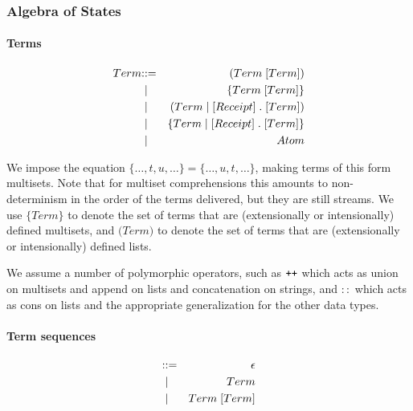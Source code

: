 \subsubsection{Algebra of States}


\paragraph{Terms}
\begin{eqnarray*}
  Term & \mathbin{\mathbf{::=}} & \mathsf{(} Term \; [Term] \mathsf{)} \\
  & \;\mathbin{\mathbf\mid}\; & \mathsf{\{} Term \; [Term] \mathsf{\}} \\
  & \;\mathbin{\mathbf\mid}\; & \mathsf{(} Term{} \;\mathsf{|}\; [Receipt] \; \mathsf{.} \; [Term] \mathsf{)} \\
  & \;\mathbin{\mathbf\mid}\; & \mathsf{\{} Term \;\mathsf{|}\; [Receipt] \; \mathsf{.} \; [Term] \mathsf{\}} \\
& \;\mathbin{\mathbf\mid}\; & Atom
\end{eqnarray*}

We impose the equation $\mathsf{\{} \ldots, t, u, \ldots \mathsf{\}} = \mathsf{\{} \ldots, u, t, \ldots \mathsf{\}}$, making terms of this form multisets. Note that for multiset comprehensions this amounts to non-determinism in the order of the terms delivered, but they are still streams. We use $\mathsf{\{}Term\mathsf{\}}$ to denote the set of terms that are (extensionally or intensionally) defined multisets, and $\mathsf{(}Term\mathsf{)}$ to denote the set of terms that are (extensionally or intensionally) defined lists.

We assume a number of polymorphic operators, such as $\mathbin{\text{\ttfamily\upshape ++}}$ which acts as union on multisets and append on lists and concatenation on strings, and $::$ which acts as cons on lists and the appropriate generalization for the other data types.

\paragraph{Term sequences}
\begin{eqnarray*}
  [Term] & \bc & \epsilon \\
  & \;\bm \; & Term \\
  & \;\bm \; & Term \; [Term]
\end{eqnarray*}

